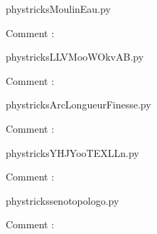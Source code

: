    \clearpage
    


    \newcommand{\CaptionFigMoulinEau}{<+Type your caption here+>}
    \begin{center}
        
    \end{center}
    phystricksMoulinEau.py

    Comment : 

    \clearpage
    


    \newcommand{\CaptionFigLLVMooWOkvAB}{<+Type your caption here+>}
    \begin{center}
        
    \end{center}
    phystricksLLVMooWOkvAB.py

    Comment : 

    \clearpage
    


    \newcommand{\CaptionFigArcLongueurFinesse}{<+Type your caption here+>}
    \begin{center}
        
    \end{center}
    phystricksArcLongueurFinesse.py

    Comment : 

    \clearpage
    


    \newcommand{\CaptionFigYHJYooTEXLLn}{<+Type your caption here+>}
    \begin{center}
        
    \end{center}
    phystricksYHJYooTEXLLn.py

    Comment : 

    \clearpage
    


    \newcommand{\CaptionFigsenotopologo}{<+Type your caption here+>}
    \begin{center}
        
    \end{center}
    phystrickssenotopologo.py

    Comment : 

    \clearpage
    


